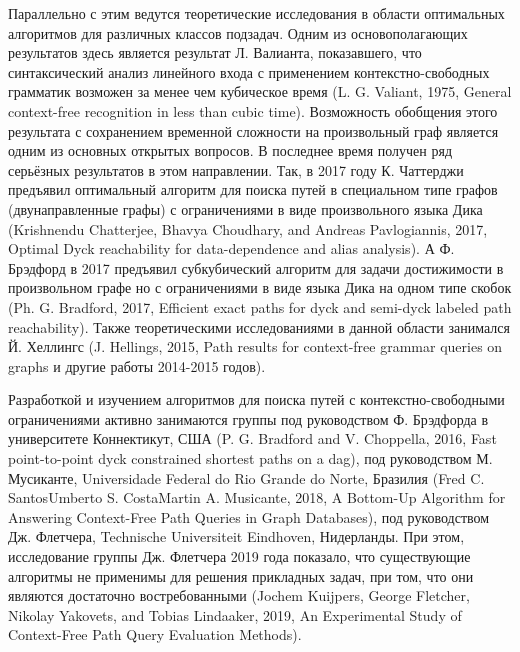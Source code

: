 \documentclass[12pt]{article}  %
\theoremstyle{remark}
\begin{document}
Параллельно с этим ведутся теоретические исследования в области оптимальных алгоритмов для различных классов подзадач. Одним из основополагающих результатов здесь является результат Л. Валианта, показавшего, что синтаксический анализ линейного входа с применением контекстно-свободных грамматик возможен за менее чем кубическое время (L. G. Valiant, 1975, General context-free recognition in less than cubic time). Возможность обобщения этого результата с сохранением временной сложности на произвольный граф является одним из основных открытых вопросов. В последнее время получен ряд серьёзных результатов в этом направлении. Так, в 2017 году К. Чаттерджи предъявил оптимальный алгоритм для поиска путей в специальном типе графов (двунаправленные графы) с ограничениями в виде произвольного языка Дика (Krishnendu Chatterjee, Bhavya Choudhary, and Andreas Pavlogiannis, 2017, Optimal Dyck reachability for data-dependence and alias analysis). А Ф. Брэдфорд в 2017 предъявил субкубический алгоритм для задачи достижимости в произвольном графе но с ограничениями в виде языка Дика на одном типе скобок (Ph. G. Bradford, 2017, Efficient exact paths for dyck and semi-dyck labeled path reachability). Также теоретическими исследованиями в данной области занимался Й. Хеллингс (J. Hellings, 2015, Path results for context-free grammar queries on graphs и другие работы 2014-2015 годов).

Разработкой и изучением алгоритмов для поиска путей с контекстно-свободными ограничениями активно занимаются группы под руководством Ф. Брэдфорда в университете Коннектикут, США (P. G. Bradford and V. Choppella, 2016, Fast point-to-point dyck constrained shortest paths on a dag), под руководством М. Мусиканте, Universidade Federal do Rio Grande do Norte, Бразилия (Fred C. SantosUmberto S. CostaMartin A. Musicante, 2018, A Bottom-Up Algorithm for Answering Context-Free Path Queries in Graph Databases), под руководством Дж. Флетчера, Technische Universiteit Eindhoven, Нидерланды. При этом, исследование группы Дж. Флетчера 2019 года показало, что существующие алгоритмы не применимы для решения прикладных задач, при том, что они являются достаточно востребованными (Jochem Kuijpers, George Fletcher, Nikolay Yakovets, and Tobias Lindaaker, 2019, An Experimental Study of Context-Free Path Query Evaluation Methods).
\end{document}
